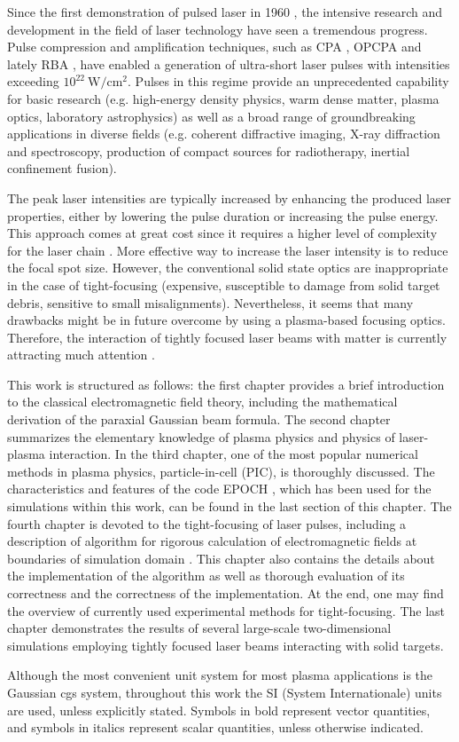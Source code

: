 Since the first demonstration of pulsed laser in 1960 \cite{Maiman1960}, the intensive research and development in the field of laser technology have seen a tremendous progress. Pulse compression and amplification techniques, such as CPA \cite{StricklandMourou1985}, OPCPA \cite{Dubietis1992} and lately RBA \cite{Malkin1999}, have enabled a generation of ultra-short laser pulses with intensities exceeding $ 10^{22} \ \mathrm{W/cm^{2}} $. Pulses in this regime provide an unprecedented capability for basic research (e.g. high-energy density physics, warm dense matter, plasma optics, laboratory astrophysics) as well as a broad range of groundbreaking applications in diverse fields (e.g. coherent diffractive imaging, X-ray diffraction and spectroscopy, production of compact sources for radiotherapy, inertial confinement fusion).

The peak laser intensities are typically increased by enhancing the produced laser properties, either by lowering the pulse duration or increasing the pulse energy. This approach comes at great cost since it requires a higher level of complexity for the laser chain \cite{Fuchs2014}. More effective way to increase the laser intensity is to reduce the focal spot size. However, the conventional solid state optics are inappropriate in the case of tight-focusing (expensive, susceptible to damage from solid target debris, sensitive to small misalignments). Nevertheless, it seems that many drawbacks might be in future overcome by using a plasma-based focusing optics. Therefore, the interaction of tightly focused laser beams with matter is currently attracting much attention \cite{Popov2008, Popov2009, Lifschitz2016, Yan2005}. 

This work is structured as follows: the first chapter provides a brief introduction to the classical electromagnetic field theory, including the mathematical derivation of the paraxial Gaussian beam formula. The second chapter summarizes the elementary knowledge of plasma physics and physics of laser-plasma interaction. In the third chapter, one of the most popular numerical methods in plasma physics, particle-in-cell (PIC), is thoroughly discussed. The characteristics and features of the code EPOCH \cite{bennett}, which has been used for the simulations within this work, can be found in the last section of this chapter. The fourth chapter is devoted to the tight-focusing of laser pulses, including a description of algorithm for rigorous calculation of electromagnetic fields at boundaries of simulation domain \cite{Thiele2016}. This chapter also contains the details about the implementation of the algorithm as well as thorough evaluation of its correctness and the correctness of the implementation. At the end, one may find the overview of currently used experimental methods for tight-focusing. The last chapter demonstrates the results of several large-scale two-dimensional simulations employing tightly focused laser beams interacting with solid targets.

Although the most convenient unit system for most plasma applications is the Gaussian cgs system, throughout this work the SI (System Internationale) units are used, unless explicitly stated. Symbols in bold represent vector quantities, and symbols in italics represent scalar quantities, unless otherwise indicated.
